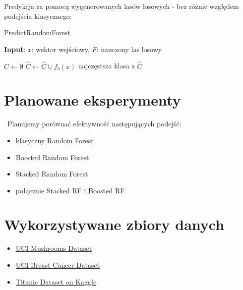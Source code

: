 \documentclass[10pt,a4paper]{article}
\begin{document}
Predykcja za pomocą wygenerowanych lasów losowych - bez różnic względem podejścia klasycznego:

\begin{algorithm}
\caption{PredictRandomForest}\label{alg:rf_predict}
\hspace*{\algorithmicindent} \textbf{Input}: $x$: wektor wejściowy, $F$: nauczony las losowy
\begin{algorithmic}[H]
	\State $\hat C \gets \emptyset$
		\State $\hat C \gets \hat C \cup {f_b(x)}$
	\EndFor
	\State \Return najczęstsza klasa z $\hat C$
\end{algorithmic}
\end{algorithm}

\section{Planowane eksperymenty}\
Planujemy porównać efektywność następujących podejść:

\begin{itemize}
    \item klasyczny Random Forest
    \item Boosted Random Forest
    \item Stacked Random Forest
    \item połącznie Stacked RF i Boosted RF
\end{itemize}


\section{Wykorzystywane zbiory danych}
\begin{itemize}
    \item \href{https://archive.ics.uci.edu/ml/datasets/Mushroom}{UCI Mushrooms Dataset}
    \item \href{https://archive.ics.uci.edu/ml/datasets/Breast+Cancer}{UCI Breast Cancer Dataset}
    \item \href{https://www.kaggle.com/datasets/vinicius150987/titanic3}{Titanic Dataset on Kaggle}
\end{itemize}
\end{document}
